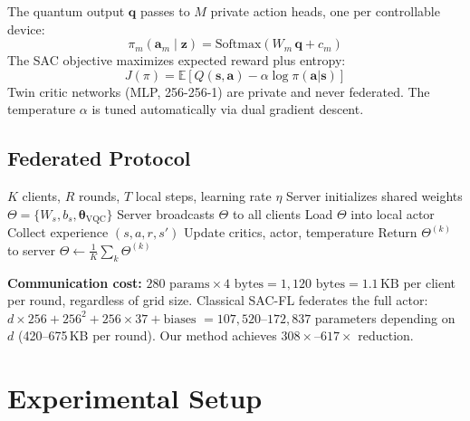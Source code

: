 \documentclass[journal]{IEEEtran}
\begin{document}
The quantum output $\mathbf{q}$ passes to $M$ private action heads,
one per controllable device:
%
\begin{equation}
    \pi_m(\mathbf{a}_m \mid \mathbf{z}) =
    \text{Softmax}(W_m\,\mathbf{q} + c_m)
\end{equation}
%
The SAC objective maximizes expected reward plus entropy:
%
\begin{equation}
    J(\pi) = \mathbb{E}\!\left[Q(\mathbf{s},\mathbf{a})
             - \alpha \log\pi(\mathbf{a}|\mathbf{s})\right]
\end{equation}
%
Twin critic networks (MLP, 256-256-1) are private and never federated.
The temperature $\alpha$ is tuned automatically via dual gradient descent.

\subsection{Federated Protocol}

\begin{algorithm}[t]
\caption{QE-SAC-FL with Aligned Encoder}
\label{alg:fl}
\begin{algorithmic}[1]
\REQUIRE $K$ clients, $R$ rounds, $T$ local steps,
         learning rate $\eta$
\STATE Server initializes shared weights
       $\Theta = \{W_s, b_s, \boldsymbol{\theta}_{\text{VQC}}\}$
    \STATE Server broadcasts $\Theta$ to all clients
        \STATE Load $\Theta$ into local actor
            \STATE Collect experience $(s,a,r,s')$
            \STATE Update critics, actor, temperature
        \ENDFOR
        \STATE Return $\Theta^{(k)}$ to server
    \ENDFOR
    \STATE $\Theta \leftarrow \frac{1}{K}\sum_k \Theta^{(k)}$
           \hfill{}
\ENDFOR
\end{algorithmic}
\end{algorithm}

\textbf{Communication cost:}
$280 \text{ params} \times 4 \text{ bytes} = 1{,}120 \text{ bytes} = 1.1\,\text{KB}$
per client per round, regardless of grid size.
Classical SAC-FL federates the full actor:
$d \times 256 + 256^2 + 256 \times 37 + \text{biases}$
$= 107{,}520$--$172{,}837$ parameters depending on $d$
(420--675\,KB per round).
Our method achieves $308\times$--$617\times$ reduction.

\section{Experimental Setup}
\label{sec:setup}
\end{document}
